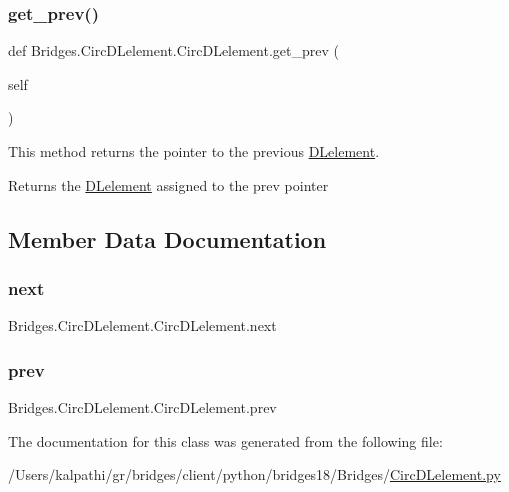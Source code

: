 \subsubsection{\texorpdfstring{get\+\_\+prev()}{get\_prev()}}
{\footnotesize\ttfamily def Bridges.\+Circ\+D\+Lelement.\+Circ\+D\+Lelement.\+get\+\_\+prev (\begin{DoxyParamCaption}\item[{}]{self }\end{DoxyParamCaption})}



This method returns the pointer to the previous \mbox{\hyperlink{namespace_bridges_1_1_d_lelement}{D\+Lelement}}. 

\begin{DoxyReturn}{Returns}
the \mbox{\hyperlink{namespace_bridges_1_1_d_lelement}{D\+Lelement}} assigned to the prev pointer 
\end{DoxyReturn}


\subsection{Member Data Documentation}
\mbox{\label{class_bridges_1_1_circ_d_lelement_1_1_circ_d_lelement_af101cccf9d2c5c2027b7d812034bc262}} 
\subsubsection{\texorpdfstring{next}{next}}
{\footnotesize\ttfamily Bridges.\+Circ\+D\+Lelement.\+Circ\+D\+Lelement.\+next}

\mbox{\label{class_bridges_1_1_circ_d_lelement_1_1_circ_d_lelement_a4aee631669271013ced8cd8d677ca812}} 
\subsubsection{\texorpdfstring{prev}{prev}}
{\footnotesize\ttfamily Bridges.\+Circ\+D\+Lelement.\+Circ\+D\+Lelement.\+prev}



The documentation for this class was generated from the following file\+:\begin{DoxyCompactItemize}
\item 
/\+Users/kalpathi/gr/bridges/client/python/bridges18/\+Bridges/\mbox{\hyperlink{_circ_d_lelement_8py}{Circ\+D\+Lelement.\+py}}\end{DoxyCompactItemize}
